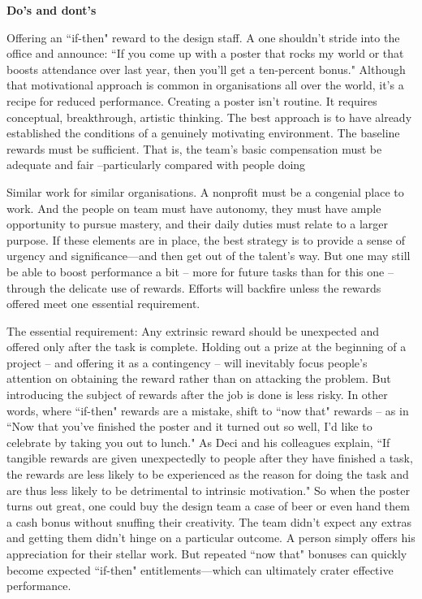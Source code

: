 \textbf{Do's and dont's}
\begin{compactitem}
\item  Offering an ``if-then" reward to the design staff. A one shouldn't stride into the office and announce: ``If you come up with a poster that rocks my world or that boosts attendance over last year, then you’ll get a ten-percent bonus." Although that motivational approach is common in organisations all over the world, it’s a recipe for reduced performance. Creating a poster isn’t routine. It requires conceptual, breakthrough, artistic thinking. The best approach is to have already established the conditions of a genuinely motivating environment. The baseline rewards must be sufficient. That is, the team’s basic compensation must be adequate and fair --particularly compared with people doing
\item Similar work for similar organisations. A nonprofit must be a congenial place to work. And the people on team must have autonomy, they must have ample opportunity to pursue mastery, and their daily duties must relate to a larger purpose. If these elements are in place, the best strategy is to provide a sense of urgency and significance—and then get out of the talent’s way. But one may still be able to boost performance a bit -- more for future tasks than for this one -- through the delicate use of rewards. Efforts will backfire unless the rewards offered meet one essential requirement. 
\item The essential requirement: Any extrinsic reward should be unexpected and offered only after the task is complete.
Holding out a prize at the beginning of a project -- and offering it as a contingency -- will inevitably focus people’s attention on obtaining the reward rather than on attacking the problem. But introducing the subject of rewards after the job is done is less risky.
In other words, where ``if-then" rewards are a mistake, shift to ``now that" rewards -- as in ``Now that you’ve finished the poster and it turned out so well, I’d like to celebrate by taking you out to lunch." 
As Deci and his colleagues explain, ``If tangible rewards are given unexpectedly to people after they have finished a task, the rewards are less likely to be experienced as the reason for doing the task and are thus less likely to be detrimental to intrinsic motivation." So when the poster turns out great, one could buy the design team a case of beer or even hand them a cash bonus without snuffing their creativity. The team didn’t expect any extras and getting them didn’t hinge on a particular outcome. A person simply offers his appreciation for their stellar work. But repeated ``now that" bonuses can quickly become expected ``if-then" entitlements—which can ultimately crater effective performance.

\end{compactitem}
